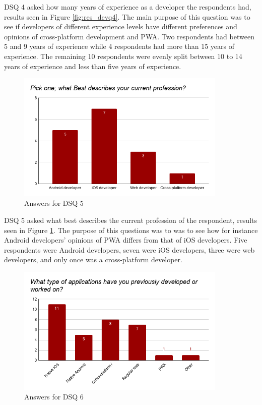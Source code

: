 \documentclass[a4paper,12pt]{article}
\begin{document}
DSQ 4 asked how many years of experience as a developer the respondents had, results seen in Figure \ref{fig:res_devq4}. The main purpose of this question was to see if developers of different experience levels have different preferences and opinions of cross-platform development and PWA. Two respondents had between 5 and 9 years of experience while 4 respondents had more than 15 years of experience. The remaining 10 respondents were evenly split between 10 to 14 years of experience and less than five years of experience.

\begin{figure}[ht!]
    \centering
    \includegraphics[width=10cm]{img/Results/dsq5.png}
    \caption{Answers for DSQ 5}
    \label{fig:res_devq5}
\end{figure}

DSQ 5 asked what best describes the current profession of the respondent, results seen in Figure \ref{fig:res_devq5}. The purpose of this questions was to was to see how for instance Android developers' opinions of PWA differs from that of iOS developers. Five respondents were Android developers, seven were iOS developers, three were web developers, and only once was a cross-platform developer.

\begin{figure}[ht!]
    \centering
    \includegraphics[width=10cm]{img/Results/dsq6.png}
    \caption{Answers for DSQ 6}
    \label{fig:res_devq6}
\end{figure}
\end{document}
